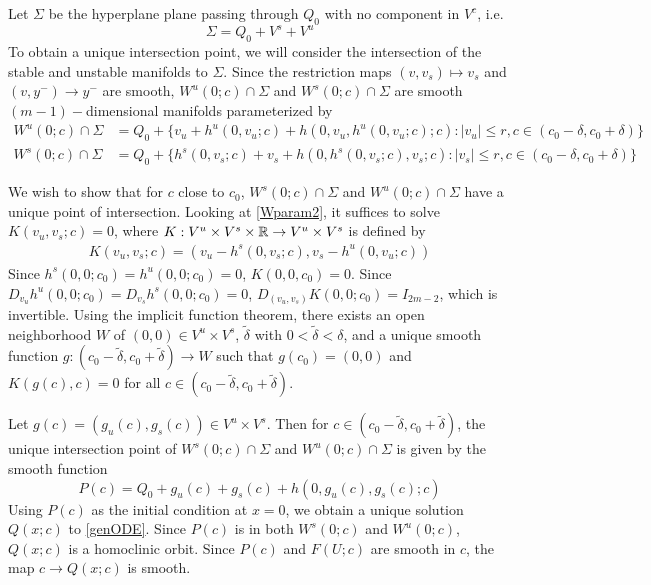 \documentclass[thesis.tex]{subfiles}
\begin{document}
Let $\Sigma$ be the hyperplane plane passing through $Q_0$ with no component in $V^c$, i.e.
\[
\Sigma = Q_0 + V^s + V^u
\]
To obtain a unique intersection point, we will consider the intersection of the stable and unstable manifolds to $\Sigma$. Since the restriction maps $(v, v_s) \mapsto v_s$ and $(v, y^-) \rightarrow y^-$ are smooth, $W^u(0; c) \cap \Sigma$ and $W^s(0; c) \cap \Sigma$ are smooth $(m-1)-$dimensional manifolds parameterized by
\begin{equation}\label{Wparam2}
\begin{aligned}
W^u(0; c) \cap \Sigma &= Q_0 + \{ v_u + h^u(0, v_u; c) + h(0, v_u, h^u(0, v_u; c); c): |v_u| \leq r, c \in (c_0 - \delta, c_0 + \delta) \} \\
W^s(0; c) \cap \Sigma &= Q_0 + \{ h^s(0, v_s; c) + v_s + h(0, h^s(0, v_s; c), v_s; c): |v_s| \leq r, c \in (c_0 - \delta, c_0 + \delta) \}
\end{aligned}
\end{equation}

We wish to show that for $c$ close to $c_0$, $W^s(0; c) \cap \Sigma$ and $W^u(0; c) \cap \Sigma$ have a unique point of intersection. Looking at \eqref{Wparam2}, it suffices to solve $K(v_u, v_s; c) = 0$, where $K: V^u \times V^s \times \mathbb{R} \rightarrow V^u \times V^s$ is defined by
\begin{align*}
K(v_u, v_s; c) = (v_u - h^s(0, v_s; c), v_s - h^u(0, v_u; c))
\end{align*}
Since $h^s(0, 0; c_0) = h^u(0, 0; c_0) = 0$, $K(0, 0, c_0) = 0$. Since $D_{v_u} h^u(0, 0; c_0) = D_{v_s} h^s(0, 0; c_0) = 0$, 
$D_{(v_u, v_s)}K(0, 0; c_0) = I_{2m-2}$, which is invertible. Using the implicit function theorem, there exists an open neighborhood $W$ of $(0, 0) \in V^u \times V^s$, $\tilde{\delta}$ with $0 < \tilde{\delta} < \delta$, and a unique smooth function $g: (c_0 - \tilde{\delta}, c_0 + \tilde{\delta}) \rightarrow W$ such that $g(c_0) = (0, 0)$ and $K(g(c), c) = 0$ for all $c \in (c_0 - \tilde{\delta}, c_0 + \tilde{\delta})$.

Let $g(c) = (g_u(c), g_s(c)) \in V^u \times V^s$. Then for $c \in (c_0 - \tilde{\delta}, c_0 + \tilde{\delta})$, the unique intersection point of $W^s(0; c) \cap \Sigma$ and $W^u(0; c) \cap \Sigma$ is given by the smooth function
\[
P(c) = Q_0 + g_u(c) + g_s(c) + h(0, g_u(c), g_s(c); c)
\]
Using $P(c)$ as the initial condition at $x = 0$, we obtain a unique solution $Q(x; c)$ to \eqref{genODE}. Since $P(c)$ is in both $W^s(0; c)$ and $W^u(0; c)$, $Q(x; c)$ is a homoclinic orbit. Since $P(c)$ and $F(U; c)$ are smooth in $c$, the map $c \rightarrow Q(x; c)$ is smooth.
\end{document}
